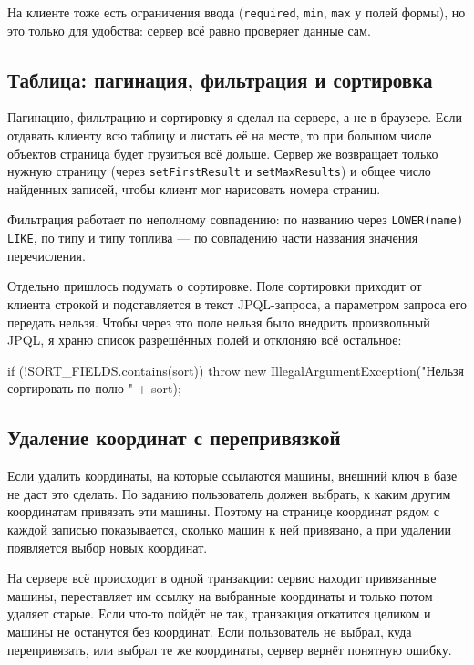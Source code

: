 \documentclass[a4paper,12pt]{article}
\begin{document}
На клиенте тоже есть ограничения ввода (\texttt{required}, \texttt{min}, \texttt{max} у полей формы), но это только для удобства: сервер всё равно проверяет данные сам.

\subsection{Таблица: пагинация, фильтрация и сортировка}

Пагинацию, фильтрацию и сортировку я сделал на сервере, а не в браузере. Если отдавать клиенту всю таблицу и листать её на месте, то при большом числе объектов страница будет грузиться всё дольше. Сервер же возвращает только нужную страницу (через \texttt{setFirstResult} и \texttt{setMaxResults}) и общее число найденных записей, чтобы клиент мог нарисовать номера страниц.

Фильтрация работает по неполному совпадению: по названию через \texttt{LOWER(name) LIKE}, по типу и типу топлива --- по совпадению части названия значения перечисления.

Отдельно пришлось подумать о сортировке. Поле сортировки приходит от клиента строкой и подставляется в текст JPQL-запроса, а параметром запроса его передать нельзя. Чтобы через это поле нельзя было внедрить произвольный JPQL, я храню список разрешённых полей и отклоняю всё остальное:

\begin{code}
if (!SORT_FIELDS.contains(sort)) throw new IllegalArgumentException("Нельзя сортировать по полю " + sort);
\end{code}

\subsection{Удаление координат с перепривязкой}

Если удалить координаты, на которые ссылаются машины, внешний ключ в базе не даст это сделать. По заданию пользователь должен выбрать, к каким другим координатам привязать эти машины. Поэтому на странице координат рядом с каждой записью показывается, сколько машин к ней привязано, а при удалении появляется выбор новых координат.

На сервере всё происходит в одной транзакции: сервис находит привязанные машины, переставляет им ссылку на выбранные координаты и только потом удаляет старые. Если что-то пойдёт не так, транзакция откатится целиком и машины не останутся без координат. Если пользователь не выбрал, куда перепривязать, или выбрал те же координаты, сервер вернёт понятную ошибку.
\end{document}
